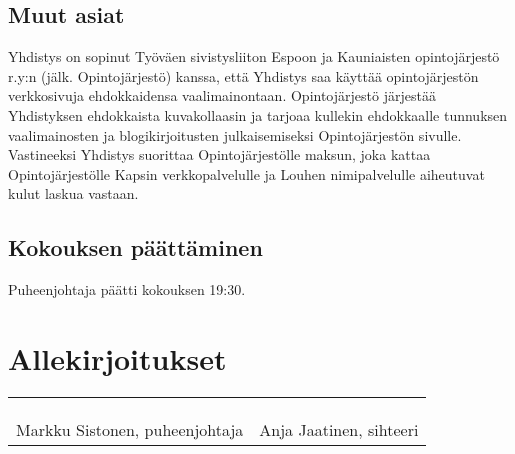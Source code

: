 \documentclass[a4paper,12pt]{article}
\begin{document}
\subsection{Muut asiat}
Yhdistys on sopinut Työväen sivistysliiton Espoon ja Kauniaisten opintojärjestö r.y:n (jälk. Opintojärjestö) kanssa, että Yhdistys saa käyttää opintojärjestön verkkosivuja ehdokkaidensa vaalimainontaan. Opintojärjestö järjestää Yhdistyksen ehdokkaista kuvakollaasin ja tarjoaa kullekin ehdokkaalle tunnuksen vaalimainosten ja blogikirjoitusten julkaisemiseksi Opintojärjestön sivulle. Vastineeksi Yhdistys suorittaa Opintojärjestölle maksun, joka kattaa Opintojärjestölle Kapsin verkkopalvelulle ja Louhen nimipalvelulle aiheutuvat kulut laskua vastaan.
\subsection{Kokouksen päättäminen}
Puheenjohtaja päätti kokouksen 19:30.
\section*{Allekirjoitukset}
\begin{flushleft}
\begin{tabular}{ll}
& \\
& \\
& \\
Markku Sistonen, puheenjohtaja &
Anja Jaatinen, sihteeri
\end{tabular}
\end{flushleft}
\end{document}
